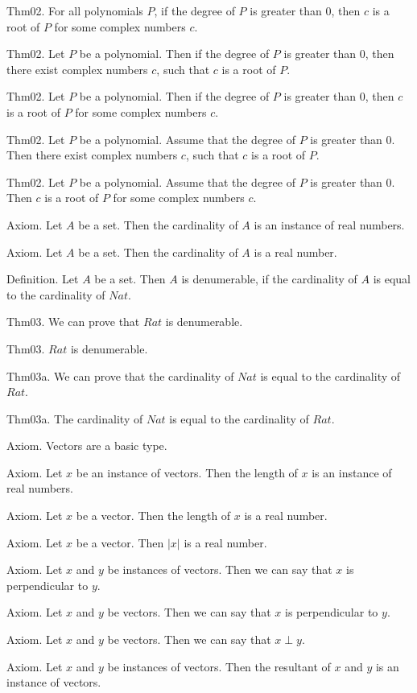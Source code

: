 \documentclass{article}
\begin{document}
Thm02. For all polynomials $P$, if the degree of $P$ is greater than $0$, then $c$ is a root of $P$ for some complex numbers $c$.

Thm02. Let $P$ be a polynomial. Then if the degree of $P$ is greater than $0$, then there exist complex numbers $c$, such that $c$ is a root of $P$.

Thm02. Let $P$ be a polynomial. Then if the degree of $P$ is greater than $0$, then $c$ is a root of $P$ for some complex numbers $c$.

Thm02. Let $P$ be a polynomial. Assume that the degree of $P$ is greater than $0$. Then there exist complex numbers $c$, such that $c$ is a root of $P$.

Thm02. Let $P$ be a polynomial. Assume that the degree of $P$ is greater than $0$. Then $c$ is a root of $P$ for some complex numbers $c$.

Axiom. Let $A$ be a set. Then the cardinality of $A$ is an instance of real numbers.

Axiom. Let $A$ be a set. Then the cardinality of $A$ is a real number.

Definition. Let $A$ be a set. Then $A$ is denumerable, if the cardinality of $A$ is equal to the cardinality of $Nat$.

Thm03. We can prove that $Rat$ is denumerable.

Thm03. $Rat$ is denumerable.

Thm03a. We can prove that the cardinality of $Nat$ is equal to the cardinality of $Rat$.

Thm03a. The cardinality of $Nat$ is equal to the cardinality of $Rat$.

Axiom. Vectors are a basic type.

Axiom. Let $x$ be an instance of vectors. Then the length of $x$ is an instance of real numbers.

Axiom. Let $x$ be a vector. Then the length of $x$ is a real number.

Axiom. Let $x$ be a vector. Then $| x |$ is a real number.

Axiom. Let $x$ and $y$ be instances of vectors. Then we can say that $x$ is perpendicular to $y$.

Axiom. Let $x$ and $y$ be vectors. Then we can say that $x$ is perpendicular to $y$.

Axiom. Let $x$ and $y$ be vectors. Then we can say that $x \perp y$.

Axiom. Let $x$ and $y$ be instances of vectors. Then the resultant of $x$ and $y$ is an instance of vectors.
\end{document}
